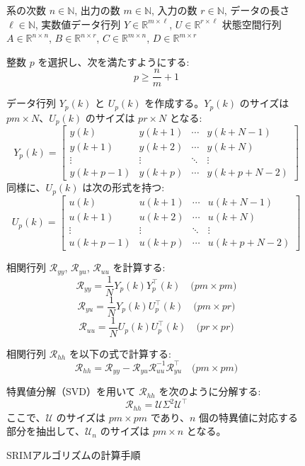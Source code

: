 \begin{figure}[htbp]
    \begin{algorithm}[H]
    \caption{SRIMアルゴリズムの計算手順}
    \begin{algorithmic}[1]
    \REQUIRE 系の次数 $n \in \mathbb{N}$, 出力の数 $m \in \mathbb{N}$, 入力の数 $r \in \mathbb{N}$, データの長さ $\ell \in \mathbb{N}$, 実数値データ行列 $Y \in \mathbb{R}^{m \times \ell}$, $U \in \mathbb{R}^{r \times \ell}$
    \ENSURE 状態空間行列 $A \in \mathbb{R}^{n \times n}$, $B \in \mathbb{R}^{n \times r}$, $C \in \mathbb{R}^{m \times n}$, $D \in \mathbb{R}^{m \times r}$
    
    \STATE 整数 $p$ を選択し、次を満たすようにする: 
    \[
    p \geq \frac{n}{m} + 1
    \]
    
    \STATE データ行列 $Y_p(k)$ と $U_p(k)$ を作成する。$Y_p(k)$ のサイズは $pm \times N$、$U_p(k)$ のサイズは $pr \times N$ となる:
    \[
    Y_p(k) = \begin{bmatrix} 
    y(k) & y(k+1) & \cdots & y(k+N-1) \\ 
    y(k+1) & y(k+2) & \cdots & y(k+N) \\ 
    \vdots & \vdots & \ddots & \vdots \\ 
    y(k+p-1) & y(k+p) & \cdots & y(k+p+N-2) 
    \end{bmatrix}
    \]
    同様に、$U_p(k)$ は次の形式を持つ:
    \[
    U_p(k) = \begin{bmatrix} 
    u(k) & u(k+1) & \cdots & u(k+N-1) \\ 
    u(k+1) & u(k+2) & \cdots & u(k+N) \\ 
    \vdots & \vdots & \ddots & \vdots \\ 
    u(k+p-1) & u(k+p) & \cdots & u(k+p+N-2) 
    \end{bmatrix}
    \]
    
    \STATE 相関行列 $\mathcal{R}_{yy}$, $\mathcal{R}_{yu}$, $\mathcal{R}_{uu}$ を計算する:
    \[
    \mathcal{R}_{yy} = \frac{1}{N} Y_p(k) Y_p^\top(k) \quad \text{($pm \times pm$)}
    \]
    \[
    \mathcal{R}_{yu} = \frac{1}{N} Y_p(k) U_p^\top(k) \quad \text{($pm \times pr$)}
    \]
    \[
    \mathcal{R}_{uu} = \frac{1}{N} U_p(k) U_p^\top(k) \quad \text{($pr \times pr$)}
    \]
    
    \STATE 相関行列 $\mathcal{R}_{hh}$ を以下の式で計算する:
    \[
    \mathcal{R}_{hh} = \mathcal{R}_{yy} - \mathcal{R}_{yu}\mathcal{R}^{-1}_{uu}\mathcal{R}^{\top}_{yu} \quad \text{($pm \times pm$)}
    \]
    
    \STATE 特異値分解（SVD）を用いて $\mathcal{R}_{hh}$ を次のように分解する:
    \[
    \mathcal{R}_{hh} = \mathcal{U}\Sigma^2\mathcal{U}^\top
    \]
    ここで、$\mathcal{U}$ のサイズは $pm \times pm$ であり、$n$ 個の特異値に対応する部分を抽出して、$\mathcal{U}_n$ のサイズは $pm \times n$ となる。
    

\end{algorithmic}
\end{algorithm}
\end{figure}
